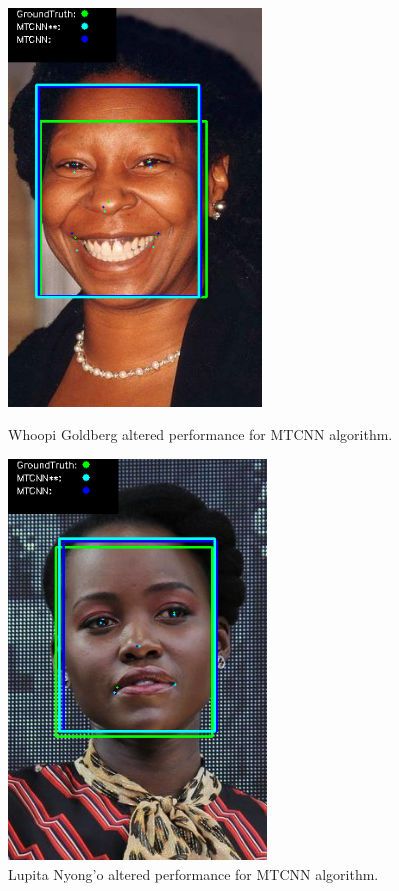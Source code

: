 \documentclass{l4proj}
\begin{document}
\begin{figure}[h!]
  \centering
  \begin{minipage}{0.49\textwidth}
    \centering
    \includegraphics[width=0.6\textwidth]{images/whoopi_result.png}
    \caption{Whoopi Goldberg altered performance for MTCNN algorithm.}
    \label{whoopi_results}
  \end{minipage}
  \hfill
  \begin{minipage}{0.49\textwidth}
    \centering
    \includegraphics[width=0.61\textwidth]{images/lupita_result.png}
    \caption{Lupita Nyong'o altered performance for MTCNN algorithm.}
    \label{lupita_result}
  \end{minipage}
  \hfill
\end{figure}
\end{document}
